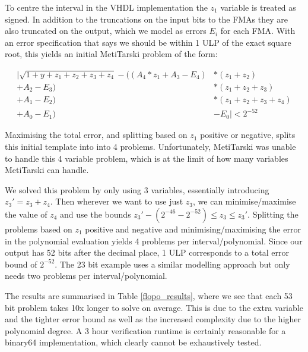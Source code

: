 \documentclass{fac}
\begin{document}
To centre the interval in the VHDL implementation the $z_1$ variable is treated as signed. In addition to the truncations on the input bits to the FMAs they are also truncated on the output, which we model as errors $E_i$ for each FMA. With an error specification that says we should be within 1 ULP of the exact square root, this yields an initial MetiTarski problem of the form:

\begin{align*}
    |\sqrt{1+y+z_1+z_2+z_3+z_4} - ((A_4 * z_1 + A_3 - E_4)&*(z_1+z_2)\\
                                  + A_2 - E_3)&*(z_1+z_2+z_3)\\
                                  + A_1 - E_2)&*(z_1+z_2+z_3+z_4)\\
                                  + A_0 - E_1)&- E_0 | < 2^{-52}
\end{align*}

Maximising the total error, and splitting based on $z_1$ positive or negative, splits this initial template into into 4 problems.
Unfortunately, MetiTarski was unable to handle this 4 variable problem, which is at the limit of how many variables MetiTarski can handle. 

We solved this problem by only using 3 variables, essentially introducing $z_3' = z_3+z_4$. Then wherever we want to use just $z_3$, we can minimise/maximise the value of $z_4$ and use the bounds $z_3' - (2^{-46} - 2^{-52}) \leq z_3 \leq z_3'$. Splitting the problems based on $z_1$ positive and negative and minimising/maximising the error in the polynomial evaluation yields 4 problems per interval/polynomial. Since our output has 52 bits after the decimal place, 1 ULP corresponds to a total error bound of $2^{-52}$. The 23 bit example uses a similar modelling approach but only needs two problems per interval/polynomial. 

The results are summarised in Table \ref{flopo_results}, where we see that each 53 bit problem takes 10x longer to solve on average. This is due to the extra variable and the tighter error bound as well as the increased complexity due to the higher polynomial degree. A 3 hour verification runtime is certainly reasonable for a binary64 implementation, which clearly cannot be exhaustively tested.

\end{document}
